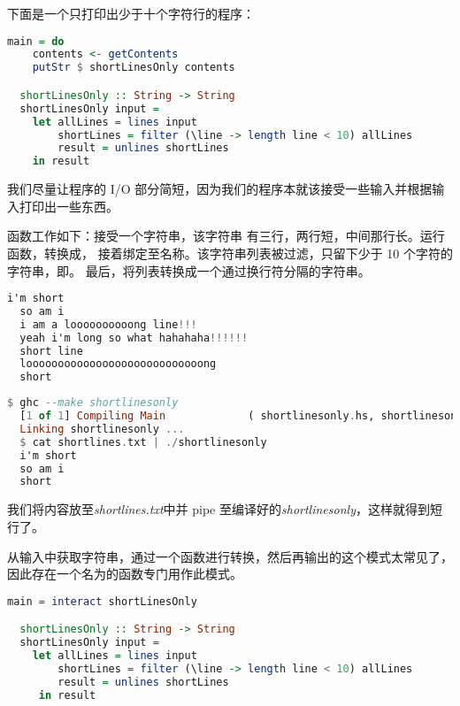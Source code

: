 \documentclass[./main.tex]{subfiles}
\begin{document}
下面是一个只打印出少于十个字符行的程序：

\begin{lstlisting}[language=Haskell]
  main = do
    contents <- getContents
    putStr $ shortLinesOnly contents

  shortLinesOnly :: String -> String
  shortLinesOnly input =
    let allLines = lines input
        shortLines = filter (\line -> length line < 10) allLines
        result = unlines shortLines
    in result
\end{lstlisting}

我们尽量让程序的 I/O 部分简短，因为我们的程序本就该接受一些输入并根据输入打印出一些东西。

函数工作如下：接受一个字符串，该字符串
有三行，两行短，中间那行长。运行函数，转换成，
接着绑定至名称。该字符串列表被过滤，只留下少于 10 个字符的字符串，即。
最后，将列表转换成一个通过换行符分隔的字符串。

\begin{lstlisting}[language=Haskell]
  i'm short
  so am i
  i am a loooooooooong line!!!
  yeah i'm long so what hahahaha!!!!!!
  short line
  loooooooooooooooooooooooooooong
  short
\end{lstlisting}

\begin{lstlisting}[language=Haskell]
  $ ghc --make shortlinesonly
  [1 of 1] Compiling Main             ( shortlinesonly.hs, shortlinesonly.o )
  Linking shortlinesonly ...
  $ cat shortlines.txt | ./shortlinesonly
  i'm short
  so am i
  short
\end{lstlisting}

我们将内容放至\textit{shortlines.txt}中并 pipe 至编译好的\textit{shortlinesonly}，这样就得到短行了。

从输入中获取字符串，通过一个函数进行转换，然后再输出的这个模式太常见了，因此存在一个名为的函数专门用作此模式。

\begin{lstlisting}[language=Haskell]
  main = interact shortLinesOnly

  shortLinesOnly :: String -> String
  shortLinesOnly input =
    let allLines = lines input
        shortLines = filter (\line -> length line < 10) allLines
        result = unlines shortLines
     in result
\end{lstlisting}
\end{document}
